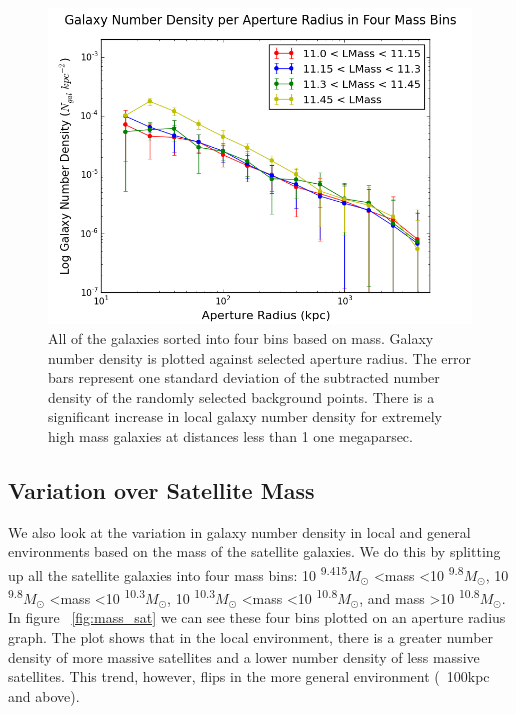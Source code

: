 \documentclass[apj]{emulateapj}
\begin{document}
\begin{figure}
\centering
\graphicspath{{C:/3d_hst/2015_finals/aperture_distance/}}
\includegraphics[width=\linewidth]{temp_lmass_final}
\caption{\footnotesize All of the galaxies sorted into four bins based on mass. Galaxy number density is plotted against selected aperture radius. The error bars represent one standard deviation of the subtracted number density of the randomly selected background points. There is a significant increase in local galaxy number density for extremely high mass galaxies at distances less than 1 one megaparsec.}
\label{fig:mass}
\end{figure}

\subsection{Variation over Satellite Mass}

We also look at the variation in galaxy number density in local and general environments based on the mass of the satellite galaxies. We do this by splitting up all the satellite galaxies into four mass bins: 10 \textsuperscript{9.415}$M_{\odot}$ \textless mass \textless 10 \textsuperscript{9.8}$M_{\odot}$, 10 \textsuperscript{9.8}$M_{\odot}$ \textless mass \textless 10 \textsuperscript{10.3}$M_{\odot}$, 10 \textsuperscript{10.3}$M_{\odot}$ \textless mass \textless 10 \textsuperscript{10.8}$M_{\odot}$, and mass \textgreater 10 \textsuperscript{10.8}$M_{\odot}$. In figure ~\ref{fig:mass_sat} we can see these four bins plotted on an aperture radius graph. The plot shows that in the local environment, there is a greater number density of more massive satellites and a lower number density of less massive satellites. This trend, however, flips in the more general environment (~100kpc and above).
\end{document}
